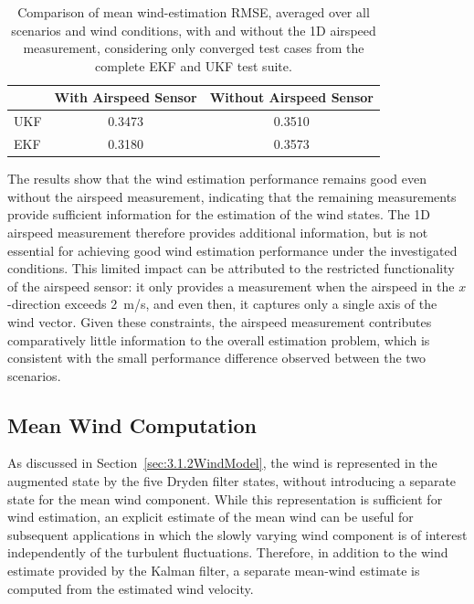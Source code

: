 \begin{table}[htbp]
	\centering
	\caption{Comparison of mean wind-estimation RMSE, averaged over all scenarios and wind conditions, with and without the 1D airspeed measurement, considering only converged test cases from the complete EKF and UKF test suite.}
	\label{tab:AS_RMSE}
	\begin{tabular}{l cc}
		\toprule
		& With Airspeed Sensor & Without Airspeed Sensor \\
		\midrule
		UKF & 0.3473 & 0.3510 \\
		EKF & 0.3180 & 0.3573 \\
		\bottomrule
	\end{tabular}
\end{table}

The results show that the wind estimation performance remains good even without the airspeed measurement, indicating that the remaining measurements provide sufficient information for the estimation of the wind states. The 1D airspeed measurement therefore provides additional information, but is not essential for achieving good wind estimation performance under the investigated conditions. This limited impact can be attributed to the restricted functionality of the airspeed sensor: it only provides a measurement when the airspeed in the $x$-direction exceeds \SI{2}{m/s}, and even then, it captures only a single axis of the wind vector. Given these constraints, the airspeed measurement contributes comparatively little information to the overall estimation problem, which is consistent with the small performance difference observed between the two scenarios.





\subsection{Mean Wind Computation}

As discussed in Section~\ref{sec:3.1.2WindModel}, the wind is represented in the augmented state by the five Dryden filter states, without introducing a separate state for the mean wind component. While this representation is sufficient for wind estimation, an explicit estimate of the mean wind can be useful for subsequent applications in which the slowly varying wind component is of interest independently of the turbulent fluctuations. Therefore, in addition to the wind estimate provided by the Kalman filter, a separate mean-wind estimate is computed from the estimated wind velocity.

